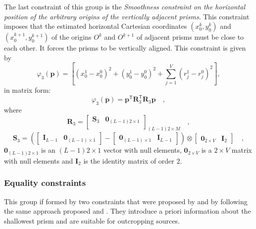 The last constraint of this group is the \textit{Smoothness constraint on the horizontal position of 
the arbitrary origins of the vertically adjacent prisms}. This constraint imposes that the estimated horizontal 
Cartesian coordinates $(x_{0}^{k}, y_{0}^{k})$ and $(x_{0}^{k+1}, y_{0}^{k+1})$ of the origins $O^{k}$ and $O^{k+1}$ 
of adjacent prisms must be close to each other. It forces the prisms to be vertically aligned. This constraint 
is given by
\begin{equation}\label{eq:phi3_sum}
\varphi_{3}(\mathbf{p}) = \left[\left(x_{0}^{1} - x_{0}^{0}\right)^2 + \left(y_{0}^{1} - y_{0}^{0}\right)^2 + \sum\limits^{V}_{j=1}\left(r^{1}_{j}-r^{0}_{j}\right)^2\right] ,
\end{equation}
in matrix form:
\begin{equation}
\varphi_{3}(\mathbf{p}) = \mathbf{p}^{\mathsf{T}} \mathbf{R}^{\mathsf{T}}_{3}\mathbf{R}_{3}\mathbf{p} \quad ,
\label{eq:phi3}
\end{equation}
where 
\begin{equation}
\mathbf{R}_{3} = 
\begin{bmatrix}
\mathbf{S}_{3} & \mathbf{0}_{(L-1)2 \times 1} \\
\end{bmatrix}_{(L-1)2 \times M} \quad ,
\label{eq:R3-matrix}
\end{equation}
\begin{equation}
\mathbf{S}_{3} =
\left( 
\begin{bmatrix} \mathbf{I}_{L-1} & \mathbf{0}_{(L-1) \times 1} \end{bmatrix} -
\begin{bmatrix} \mathbf{0}_{(L-1) \times 1} & \mathbf{I}_{L-1} \end{bmatrix} 
\right) \otimes 
\begin{bmatrix} \mathbf{0}_{2 \times V} & \mathbf{I}_{2} \end{bmatrix} \quad ,
\label{eq:S3-matrix}
\end{equation}
$\mathbf{0}_{(L-1)2 \times 1}$ is an $(L-1)2 \times 1$ vector with null elements,
$\mathbf{0}_{2 \times V}$ is a $2 \times V$ matrix with null elements and 
$\mathbf{I}_{2}$ is the identity matrix of order $2$.

\subsubsection{Equality constraints}

This group if formed by two constraints that were proposed by \cite{oliveirajr-etal2011} and \cite{oliveirajr-barbosa2013} by following the same approach proposed \cite{barbosa-etal1997} and 
\cite{barbosa-etal1999}. They introduce a priori information about the shallowest prism and are  suitable for outcropping sources.

